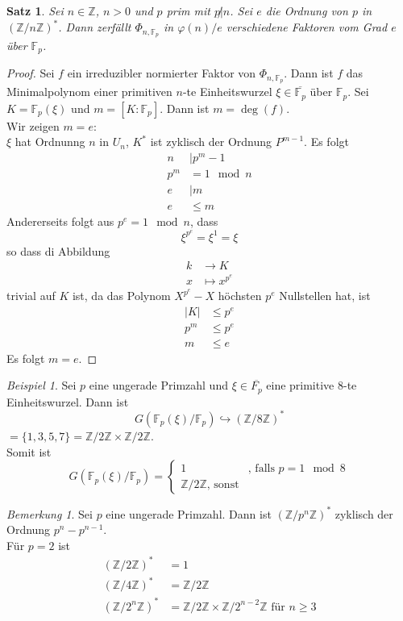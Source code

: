 \documentclass[10pt,a4paper]{article}
\newcommand{\Z}{\ensuremath{\mathbb{Z}}}
\newcommand{\F}{\ensuremath{\mathbb{F}}}
\newcommand{\ol}[1]{\overline{#1}}
\newcommand{\abs}[1]{\left|#1\right|}
\theoremstyle{plain}
\newtheorem{satz}[theorem]{Satz}
\theoremstyle{definition}
\theoremstyle{remark}
\newtheorem{bem}[theorem]{Bemerkung}
\newtheorem{exm}[theorem]{Beispiel}
\begin{document}
	\begin{satz}
		Sei $n\in\Z$, $n>0$ und $p$ prim mit $p\not| n$. Sei $e$ die Ordnung von $p$ in $\left(\Z/n\Z\right)^*$. Dann zerfällt $\Phi_{n,\F_p}$ in $\varphi(n)/e$ verschiedene Faktoren vom Grad $e$ über $\F_p$.
	\end{satz}
	\begin{proof}
		Sei $f$ ein irreduzibler normierter Faktor von $\Phi_{n,\F_p}$. Dann ist $f$ das Minimalpolynom einer primitiven $n$-te Einheitswurzel $\xi\in\ol{\F_p}$ über $\F_p$. Sei $K=\F_p(\xi)$ und $m=[K:\F_p]$. Dann ist $m=\deg(f)$. \\
		Wir zeigen $m=e$:\\
		$\xi$ hat Ordnunng $n$ in $U_n$, $K^*$ ist zyklisch der Ordnung $P^{m-1}$. Es folgt
		\begin{align*}
			n&|p^m-1\\
			p^{m}&=1\mod n\\
			e&|m\\
			e&\leq m
		\end{align*}
		Andererseits folgt aus $p^e=1\mod n$, dass
		\[\xi^{p^e}=\xi^1=\xi\]
		so dass di Abbildung
		\begin{align*}
		k&\to K\\
		x&\mapsto x^{p^e}
		\end{align*}
		trivial auf $K$ ist, da das Polynom $X^{p^e}-X$ höchsten $p^e$ Nullstellen hat, ist
		\begin{align*}
		\abs{K}&\leq p^e\\
		p^m&\leq p^e\\
		m&\leq e
		\end{align*}
		Es folgt $m=e$.
	\end{proof}

	\begin{exm}
		Sei $p$ eine ungerade Primzahl und $\xi\in\ol{F_p}$ eine primitive 8-te Einheitswurzel. Dann ist
		\[G\left(\F_p(\xi)/\F_p\right)\hookrightarrow \left(\Z/8\Z\right)^*\]
		$=\{1,3,5,7\}=\Z/2\Z\times\Z/2\Z$.\\
		Somit ist
		\[G(\F_p(\xi)/\F_p)=\begin{cases}
		1&\text{, falls }p=1\mod 8\\
		\Z/2\Z\text{, sonst}
		\end{cases}\]
	\end{exm}

	\begin{bem}
		Sei $p$ eine ungerade Primzahl. Dann ist $(\Z/p^n\Z)^*$ zyklisch der Ordnung $p^{n}-p^{n-1}$.\\
		Für $p=2$ ist
		\begin{align*}
		\left(\Z/2\Z\right)^*&=1\\
		\left(\Z/4\Z\right)^*&=\Z/2\Z\\
		\left(\Z/2^n\Z\right)^*&=\Z/2\Z\times \Z/2^{n-2}\Z\text{ für $n\geq 3$}
		\end{align*}
	\end{bem}
\end{document}
